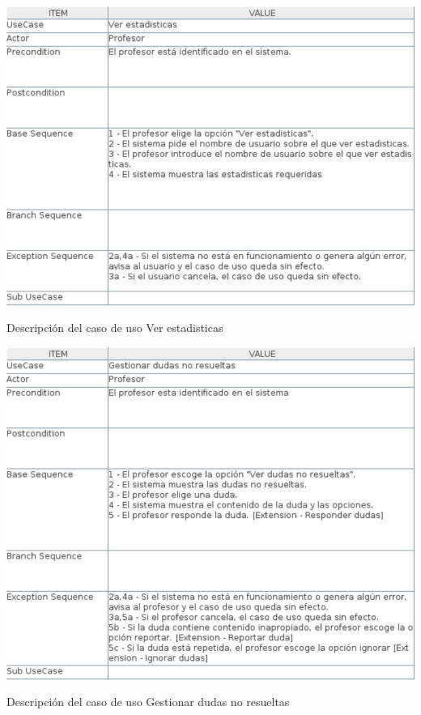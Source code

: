 \documentclass[openright,twoside,10pt]{book}
\begin{document}
    \vspace*{\fill}
    
    \newpage
    
    \vspace*{\fill}
    
    \begin{table}[H]
        \begin{center}
            \includegraphics[width=\textwidth]{img/astah/analisis/casos_de_uso/useCase07.png}
        \end{center}
        \caption{Descripción del caso de uso Ver estadisticas}
    \end{table}
    
    \vspace*{\fill}
    
    \newpage
    
    \vspace*{\fill}
    
    \begin{table}[H]
        \begin{center}
            \includegraphics[width=\textwidth]{img/astah/analisis/casos_de_uso/useCase08.png}
        \end{center}
        \caption{Descripción del caso de uso Gestionar dudas no resueltas}
    \end{table}
    
\end{document}
